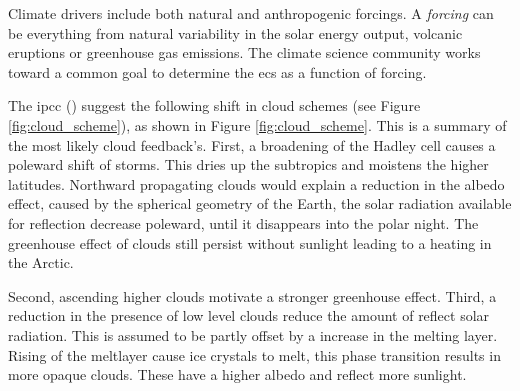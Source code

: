 Climate drivers include both natural and anthropogenic forcings. A \textit{forcing} can be everything from natural variability in the solar energy output, volcanic eruptions or greenhouse gas emissions. The climate science community works toward a common goal to determine the \acrshort{ecs} as a function of forcing. %

The \acrshort{ipcc} (\cite{IPCC_CH7_clouds}) suggest the following shift in cloud schemes (see Figure \ref{fig:cloud_scheme}), as shown in Figure \ref{fig:cloud_scheme}. This is a summary of the most likely cloud feedback's. First, a broadening of the Hadley cell causes a poleward shift of storms. This dries up the subtropics and moistens the higher latitudes. Northward propagating clouds would explain a reduction in the albedo effect, caused by the spherical geometry of the Earth, the solar radiation available for reflection decrease poleward, until it disappears into the polar night. 
The greenhouse effect of clouds still persist without sunlight leading to a heating in the Arctic.

Second, ascending higher clouds motivate a stronger greenhouse effect. Third, a reduction in the presence of low level clouds reduce the amount of reflect solar radiation. This is assumed to be partly offset by a increase in the melting layer. Rising of the meltlayer cause ice crystals to melt, this phase transition results in more opaque clouds. These have a higher albedo and reflect more sunlight. 